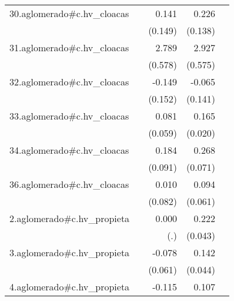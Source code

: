 {\begin{longtable}{l*{4}{D{.}{.}{-1}}}
\addlinespace
30.aglomerado#c.hv\_cloacas&                     &       0.141         &       0.226         &                     \\
            &                     &     (0.149)         &     (0.138)         &                     \\
\addlinespace
31.aglomerado#c.hv\_cloacas&                     &       2.789\sym{***}&       2.927\sym{***}&                     \\
            &                     &     (0.578)         &     (0.575)         &                     \\
\addlinespace
32.aglomerado#c.hv\_cloacas&                     &      -0.149         &      -0.065         &                     \\
            &                     &     (0.152)         &     (0.141)         &                     \\
\addlinespace
33.aglomerado#c.hv\_cloacas&                     &       0.081         &       0.165\sym{***}&                     \\
            &                     &     (0.059)         &     (0.020)         &                     \\
\addlinespace
34.aglomerado#c.hv\_cloacas&                     &       0.184\sym{*}  &       0.268\sym{***}&                     \\
            &                     &     (0.091)         &     (0.071)         &                     \\
\addlinespace
36.aglomerado#c.hv\_cloacas&                     &       0.010         &       0.094         &                     \\
            &                     &     (0.082)         &     (0.061)         &                     \\
\addlinespace
2.aglomerado#c.hv\_propieta&                     &       0.000         &       0.222\sym{***}&                     \\
            &                     &         (.)         &     (0.043)         &                     \\
\addlinespace
3.aglomerado#c.hv\_propieta&                     &      -0.078         &       0.142\sym{**} &                     \\
            &                     &     (0.061)         &     (0.044)         &                     \\
\addlinespace
4.aglomerado#c.hv\_propieta&                     &      -0.115\sym{*}  &       0.107\sym{**} &                     \\

\end{longtable}}
